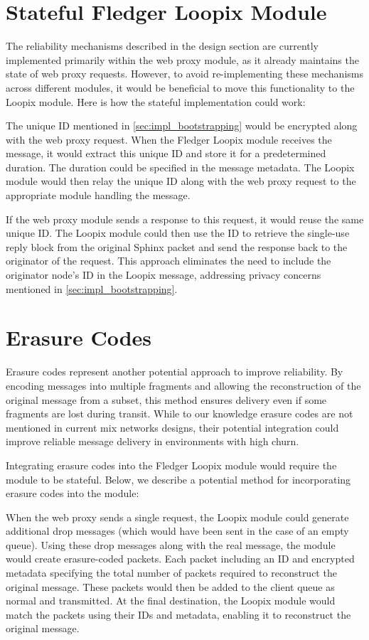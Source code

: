 \documentclass[a4paper,11pt,oneside]{report}
\begin{document}
\section{Stateful Fledger Loopix Module}

The reliability mechanisms described in the design section are currently implemented primarily within the web proxy module, as it already maintains the state of web proxy requests. However, to avoid re-implementing these mechanisms across different modules, it would be beneficial to move this functionality to the Loopix module. Here is how the stateful implementation could work:

The unique ID mentioned in \autoref{sec:impl_bootstrapping} would be encrypted along with the web proxy request. When the Fledger Loopix module receives the message, it would extract this unique ID and store it for a predetermined duration. The duration could be specified in the message metadata. The Loopix module would then relay the unique ID along with the web proxy request to the appropriate module handling the message.

If the web proxy module sends a response to this request, it would reuse the same unique ID. The Loopix module could then use the ID to retrieve the single-use reply block from the original Sphinx packet and send the response back to the originator of the request. This approach eliminates the need to include the originator node's ID in the Loopix message, addressing privacy concerns mentioned in \autoref{sec:impl_bootstrapping}.

\section{Erasure Codes}
Erasure codes represent another potential approach to improve reliability. By encoding messages into multiple fragments and allowing the reconstruction of the original message from a subset, this method ensures delivery even if some fragments are lost during transit. While to our knowledge erasure codes are not mentioned in current mix networks designs, their potential integration could improve reliable message delivery in environments with high churn.

Integrating erasure codes into the Fledger Loopix module would require the module to be stateful. Below, we describe a potential method for incorporating erasure codes into the module:

When the web proxy sends a single request, the Loopix module could generate additional drop messages (which would have been sent in the case of an empty queue). Using these drop messages along with the real message, the module would create erasure-coded packets. Each packet including an ID and encrypted metadata specifying the total number of packets required to reconstruct the original message. These packets would then be added to the client queue as normal and transmitted. At the final destination, the Loopix module would match the packets using their IDs and metadata, enabling it to reconstruct the original message.
\end{document}
